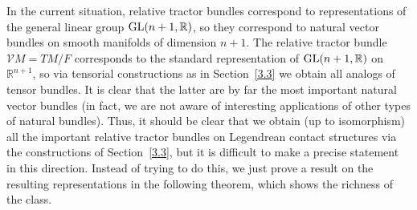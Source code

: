 \documentclass[10pt,a4paper]{amsart}
\numberwithin{equation}{section}
\def\Bbb{\mathbb}
\def\Cal{\mathcal}
\begin{document}
In the current situation, relative tractor bundles correspond to representations of
the general linear group ${\rm GL}(n+1,\Bbb R)$, so they correspond to natural vector
bundles on smooth manifolds of dimension $n+1$. The relative tractor bundle
$\Cal VM=TM/F$ corresponds to the standard representation of ${\rm GL}(n+1,\Bbb R)$ on
$\Bbb R^{n+1}$, so via tensorial constructions as in Section~\ref{3.3} we obtain all
analogs of tensor bundles. It is clear that the latter are by far the most important
natural vector bundles (in fact, we are not aware of interesting applications of
other types of natural bundles). Thus, it should be clear that we obtain (up to
isomorphism) all the important relative tractor bundles on Legendrean contact
structures via the constructions of Section~\ref{3.3}, but it is difficult to make a
precise statement in this direction. Instead of trying to do this, we just prove a
result on the resulting representations in the following theorem, which shows the
richness of the class.
\end{document}
